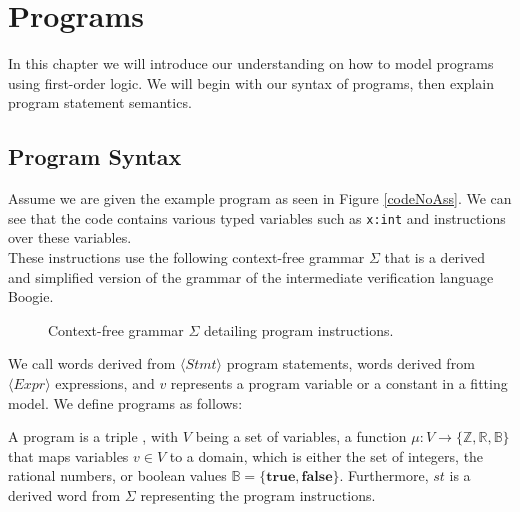\section{Programs}
In this chapter we will introduce our understanding on how to model programs using first-order logic. We will begin with our syntax of programs, then explain program statement semantics.

\subsection{Program Syntax}
Assume we are given the example program as seen in Figure \ref{codeNoAss}. We can see that the code contains various typed variables such as \texttt{x:int} and instructions over these variables. \\ These instructions use the following context-free grammar $\Sigma$ that is a derived and simplified version of the grammar of the intermediate verification language Boogie\cite{Boogie}.
\setlength{\grammarparsep}{20pt plus 1pt minus 1pt} %
\setlength{\grammarindent}{12em} %
\begin{figure}[H]
	
	\caption{Context-free grammar $\Sigma$ detailing program instructions.}
	\label{grmr}
\end{figure}
We call words derived from $\langle Stmt \rangle$ program statements, words derived from $\langle Expr \rangle$ expressions, and $v$ represents a program variable or a constant in a fitting model.
We define programs as follows:

\begin{mydef}[Programs]
	A program is a triple \prg, with $V$ being a set of variables, a function $\mu: V \rightarrow \{ \mathbb{Z}, \mathbb{R}, \mathbb{B} \}$ that maps variables $v \in V$ to a domain, which is either the set of integers, the rational numbers, or boolean values $\mathbb{B} = \{\textbf{true}, \textbf{false}\}$. Furthermore, $st$ is a derived word from $\Sigma$ representing the program instructions.
\end{mydef}
